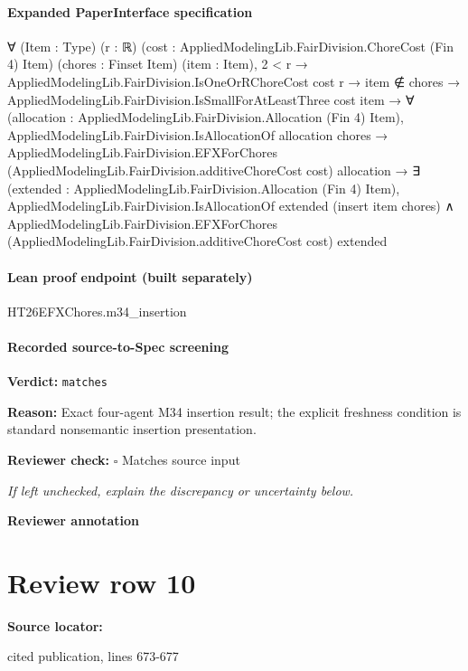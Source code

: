 \documentclass[10pt]{article}
\newcommand{\reviewerbox}{%
  \par\noindent\fbox{\parbox{0.96\linewidth}{\rule{0pt}{0.38in}}}\par
}
\newcommand{\reviewmatch}[1]{%
  \par\noindent\textbf{Reviewer check:} $\square$\; #1\par
  \noindent\emph{If left unchecked, explain the discrepancy or uncertainty below.}\par
}
\begin{document}
\paragraph{Expanded PaperInterface specification}
\begin{ReviewVerbatim}
∀ (Item : Type) (r : ℝ) (cost : AppliedModelingLib.FairDivision.ChoreCost (Fin 4) Item) (chores : Finset Item)
  (item : Item),
  2 < r →
    AppliedModelingLib.FairDivision.IsOneOrRChoreCost cost r →
      item ∉ chores →
        AppliedModelingLib.FairDivision.IsSmallForAtLeastThree cost item →
          ∀ (allocation : AppliedModelingLib.FairDivision.Allocation (Fin 4) Item),
            AppliedModelingLib.FairDivision.IsAllocationOf allocation chores →
              AppliedModelingLib.FairDivision.EFXForChores (AppliedModelingLib.FairDivision.additiveChoreCost cost)
                  allocation →
                ∃ (extended : AppliedModelingLib.FairDivision.Allocation (Fin 4) Item),
                  AppliedModelingLib.FairDivision.IsAllocationOf extended (insert item chores) ∧
                    AppliedModelingLib.FairDivision.EFXForChores
                      (AppliedModelingLib.FairDivision.additiveChoreCost cost) extended
\end{ReviewVerbatim}



\paragraph{Lean proof endpoint (built separately)}\begin{ReviewVerbatim}
HT26EFXChores.m34_insertion
\end{ReviewVerbatim}

\paragraph{Recorded source-to-Spec screening}
\textbf{Verdict:} \texttt{matches}
\\
{\raggedright
\textbf{Reason:} Exact four-\allowbreak{}agent M34 insertion result;\allowbreak{} the explicit freshness condition is standard nonsemantic insertion presentation.\allowbreak{}
\par}
\reviewmatch{Matches source input}
\noindent\textbf{Reviewer annotation}\par
\reviewerbox
\clearpage
\hypertarget{source-claim-5fbcb5b015031605}{}
\section*{Review row 10}
\textbf{Source locator:} {\footnotesize\raggedright cited publication, lines 673-\allowbreak{}677\par}
\end{document}
